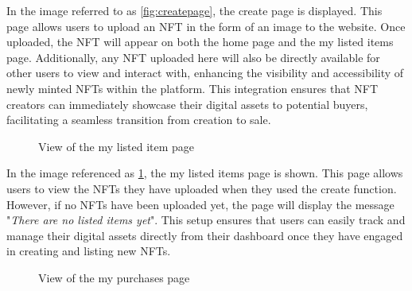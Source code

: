     In the image referred to as \ref{fig:createpage}, the create page is displayed. This page allows users to upload an NFT in the form of an image to the website. Once uploaded, the NFT will appear on both the home page and the my listed items page. Additionally, any NFT uploaded here will also be directly available for other users to view and interact with, enhancing the visibility and accessibility of newly minted NFTs within the platform. This integration ensures that NFT creators can immediately showcase their digital assets to potential buyers, facilitating a seamless transition from creation to sale.

  \begin{figure} [H] \centering
    \caption{View of the my listed item page}
    \label{fig:listingpage}
    \end{figure}
  
    In the image referenced as \ref{fig:listingpage}, the my listed items page is shown. This page allows users to view the NFTs they have uploaded when they used the create function. However, if no NFTs have been uploaded yet, the page will display the message "\emph{There are no listed items yet}". This setup ensures that users can easily track and manage their digital assets directly from their dashboard once they have engaged in creating and listing new NFTs.    

  \begin{figure} [H] \centering
    \caption{View of the my purchases page}
    \label{fig:purchasepage}
    \end{figure}
  
